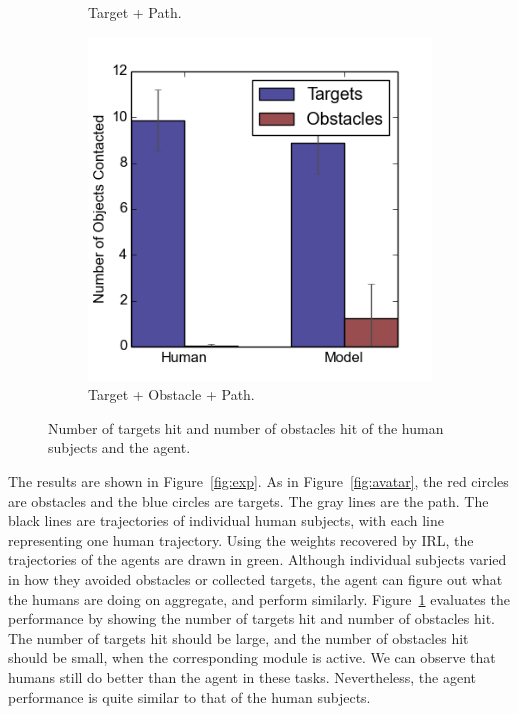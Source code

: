 \begin{figure}[h]
\begin{subfigure}[b]{0.24\textwidth}
\caption{Target + Path. }
\end{subfigure}
\begin{subfigure}[b]{0.24\textwidth}
\includegraphics[width=\textwidth]{contact4.png}
\caption{Target + Obstacle + Path. }
\end{subfigure}
\caption{Number of targets hit and number of obstacles hit of the human subjects 
and the agent.}
\label{fig:stats}
\end{figure}


The results are shown in Figure~\ref{fig:exp}. As in Figure~\ref{fig:avatar},
the red circles are obstacles and the blue circles are targets. The gray lines
are the path. The black lines are trajectories of individual human subjects,
with each line representing one human trajectory.  Using the weights recovered
by IRL, the trajectories of the agents are drawn in green. Although individual
subjects varied in how they avoided obstacles or collected targets, the agent
can figure out what the humans are doing on aggregate, and perform similarly.
Figure~\ref{fig:stats} evaluates the performance by showing the number of
targets hit and number of obstacles hit.  The number of targets hit should be
large, and the number of obstacles hit should be small, when the corresponding
module is active.  We can observe that humans still do better than the agent in
these tasks.  Nevertheless, the agent performance is quite similar to that of
the human subjects.

